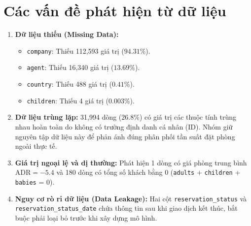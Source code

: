 \section{Các vấn đề phát hiện từ dữ liệu}
\begin{enumerate}
    \item \textbf{Dữ liệu thiếu (Missing Data):}
    \begin{itemize}
        \item \texttt{company}: Thiếu 112,593 giá trị ($94.31\%$).
        \item \texttt{agent}: Thiếu 16,340 giá trị ($13.69\%$).
        \item \texttt{country}: Thiếu 488 giá trị ($0.41\%$).
        \item \texttt{children}: Thiếu 4 giá trị ($0.003\%$).
    \end{itemize}
    \item \textbf{Dữ liệu trùng lặp:} 31,994 dòng ($26.8\%$) có giá trị các thuộc tính trùng nhau hoàn toàn do không có trường định danh cá nhân (ID). Nhóm giữ nguyên tập dữ liệu này để phản ánh đúng phân phối tần suất đặt phòng ngoài thực tế.
    \item \textbf{Giá trị ngoại lệ và dị thường:} Phát hiện 1 dòng có giá phòng trung bình $\text{ADR} = -5.4$ và 180 dòng có tổng số khách bằng 0 (\texttt{adults} + \texttt{children} + \texttt{babies} = 0).
    \item \textbf{Nguy cơ rò rỉ dữ liệu (Data Leakage):} Hai cột \texttt{reservation\_status} và \texttt{reservation\_status\_date} chứa thông tin sau khi giao dịch kết thúc, bắt buộc phải loại bỏ trước khi xây dựng mô hình.
\end{enumerate}
